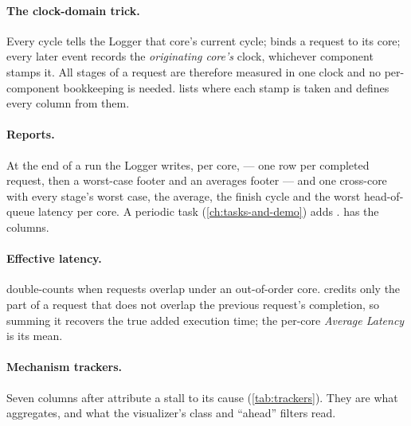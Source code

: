 \paragraph{The clock-domain trick.} Every cycle  tells the Logger that
core's current cycle;  binds a request to its core; every later event records
the \emph{originating core's} clock, whichever component stamps it. All stages of a request are
therefore measured in one clock and no per-component bookkeeping is needed.
 lists where each stamp is taken and defines every column from them.

\paragraph{Reports.} At the end of a run the Logger writes, per core,
 --- one row per completed request, then a worst-case footer and
an averages footer --- and one cross-core  with every stage's worst case,
the average, the finish cycle and the worst head-of-queue latency per core. A periodic task
(\cref{ch:tasks-and-demo}) adds .  has the columns.

\paragraph{Effective latency.}  double-counts when requests overlap under an
out-of-order core.  credits only the part of a request that does not overlap the
previous request's completion, so summing it recovers the true added execution time; the
per-core \emph{Average Latency} is its mean.

\paragraph{Mechanism trackers.} Seven columns after  attribute a stall to its cause
(\cref{tab:trackers}). They are what  aggregates, and what
the visualizer's class and ``ahead'' filters read.

